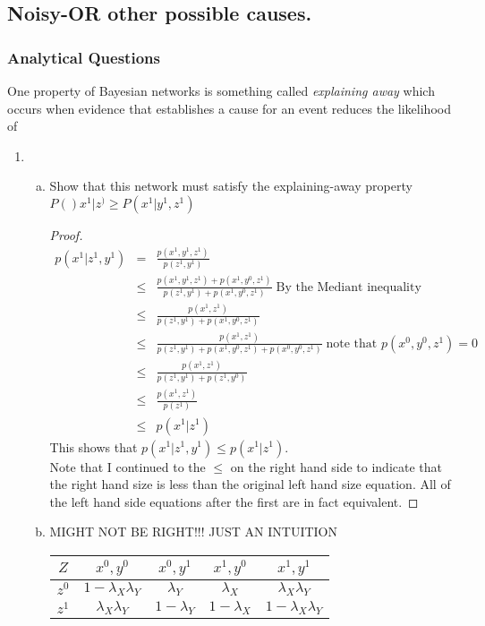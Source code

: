 \documentclass[12pt]{article}
\begin{document}
\subsection{Noisy-OR  other possible causes.}
	\subsubsection{Analytical Questions}
	One property of Bayesian networks is something called \textit{explaining away }which occurs when
evidence that establishes a cause for an event reduces the likelihood of
		\begin{enumerate}
			\item	
				\begin{enumerate}[(a)]
					\item Show that this network must satisfy the explaining-away property $P()x^1|z^) \geq P(x^1|y^1,z^1)$
					\begin{proof}
					\begin{eqnarray*}
						p(x^1|z^1,y^1) &=& \frac{p(x^1,y^1,z^1)}{p(z^1,y^1)} \\
												&\leq & \frac{p(x^1,y^1,z^1) + p(x^1,y^0,z^1)}{p(z^1,y^1) + p(x^1,y^0,z^1)}\; \text{By the Mediant inequality} \\
												&\leq & \frac{p(x^1,z^1)}{p(z^1,y^1) + p(x^1,y^0,z^1)} \\
												&\leq & \frac{p(x^1,z^1)}{p(z^1,y^1) + p(x^1,y^0,z^1) + p(x^0,y^0,z^1)}\; \text{note that } p(x^0,y^0,z^1) = 0 \\
												&\leq & \frac{p(x^1,z^1)}{p(z^1,y^1) + p(z^1,y^0)} \\
												&\leq & \frac{p(x^1,z^1)}{p(z^1)} \\
												&\leq & p(x^1|z^1)
					\end{eqnarray*}
					This shows that $p(x^1|z^1,y^1) \leq p(x^1|z^1)$. \\
					Note that I continued to the $\leq$ on the right hand side to indicate that the right hand size is less than the original left hand size equation. All of the left hand side equations after the first are in fact equivalent. 
					\end{proof}
						\item 
						MIGHT NOT BE RIGHT!!! JUST AN INTUITION \\
							\begin{tabular}{c||c c c c}
								$Z$ & $x^0,y^0$ & $x^0,y^1$ & $x^1,y^0$ & $x^1,y^1$  \\ \hline
								$z^0$ & $1 - \lambda_X\lambda_Y$ & $\lambda_Y$ & $\lambda_X$ & $\lambda_X\lambda_Y$ \\
								$z^1$ & $\lambda_X\lambda_Y$ & $1 - \lambda_Y$ & $1- \lambda_X$ & $1- \lambda_X\lambda_Y$
							

\end{tabular}
\end{enumerate}
\end{enumerate}
\end{document}
